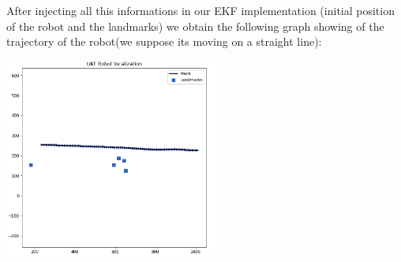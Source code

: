\documentclass[11pt,a4paper]{report}
\begin{document}
After injecting all this informations in our EKF implementation (initial position of the robot and the landmarks) we obtain the following graph showing of the trajectory of the robot(we suppose its moving on a straight line):

\begin{center}\label{fig4}
	\includegraphics[width=7cm]{Capture9.png}\\
\end{center}



















 


  
\end{document}
